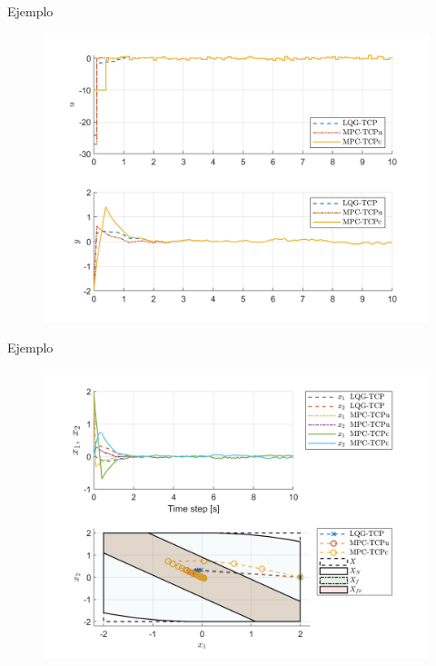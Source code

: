 \documentclass[8pt]{beamer}
\begin{document}
\begin{frame}{Ejemplo}
	\begin{figure}[!ht]
		\centering
		\includegraphics[width=1\linewidth]{figures/LQG_MPCu_MPCc_input+output}
	\end{figure}
\end{frame}

\begin{frame}{Ejemplo}
	\begin{figure}[!ht]
		\centering
		\includegraphics[width=1\linewidth]{figures/LQG_MPCu_MPCc_phaseplot}
	\end{figure}
\end{frame}
\end{document}
